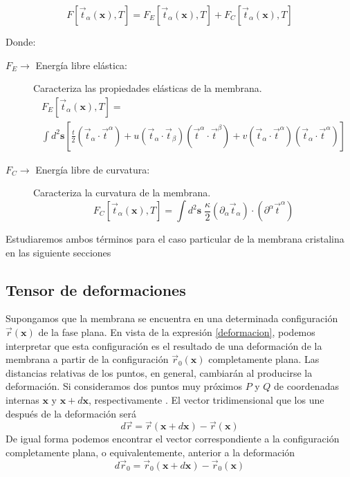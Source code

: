 \begin{equation}
 F[\vec{t}_{\alpha}(\mathbf{x}),T]= F_E[\vec{t}_{\alpha}(\mathbf{x}),T]+F_C[\vec{t}_{\alpha}(\mathbf{x}),T]
\end{equation}

Donde:
\begin{description}
\item[ $F_E\rightarrow $ Energía libre elástica:] Caracteriza las propiedades elásticas de la membrana.
  \begin{multline}\label{ELandau_elastica}
    F_E[\vec{t}_{\alpha}(\mathbf{x}),T]=\\\int d^2\mathbf{s}
    \left[
      \frac{t}{2}(\vec{t}_{\alpha}\cdot\vec{t}^{\alpha})+
      u(\vec{t}_{\alpha}\cdot\vec{t}_{\beta})(\vec{t}^{\alpha}\cdot\vec{t}^{\beta})+
      v(\vec{t}_{\alpha}\cdot\vec{t}^{\alpha})(\vec{t}_{\alpha}\cdot\vec{t}^{\alpha})\right]
  \end{multline}
\item[ $F_C\rightarrow $ Energía libre de curvatura:] Caracteriza la curvatura
  de la membrana. 
  \begin{equation}\label{ELandau_curvatura}
       F_C[\vec{t}_{\alpha}(\mathbf{x}),T]=\int d^2\mathbf{s}\; 
      \frac{\kappa}{2}(\partial_{\alpha}\vec{t}_{\alpha})\cdot(\partial^{\alpha}\vec{t}^{\alpha})
  \end{equation}
\end{description}

Estudiaremos ambos términos para el caso particular de la membrana cristalina
en las siguiente secciones

\subsection{Tensor de deformaciones}

Supongamos que la membrana se encuentra en una determinada configuración
$\vec{r}(\mathbf{x})$ de la fase plana. En vista de la expresión
\eqref{deformacion}, podemos interpretar que esta configuración es el
resultado de una deformación de la membrana a partir de la configuración
$\vec{r}_0(\mathbf{x})$ completamente plana. Las distancias relativas de los
puntos, en general, cambiarán al producirse la deformación. Si
consideramos dos puntos muy próximos $P$ y $Q$ de coordenadas internas
$\mathbf{x}$ y $\mathbf{x}+d\mathbf{x}$, respectivamente \cite{Landau_Elasticidad}. El vector tridimensional que los une
después de la deformación será
\begin{equation}\label{dr}
d\vec{r}= \vec{r}(\mathbf{x}+d\mathbf{x})-\vec{r}(\mathbf{x})
\end{equation}
De igual forma podemos encontrar el vector correspondiente a la configuración
completamente plana, o equivalentemente, anterior a la deformación
\begin{equation}\label{dr0}
d\vec{r}_0= \vec{r}_0(\mathbf{x}+d\mathbf{x})-\vec{r}_0(\mathbf{x})
\end{equation}

